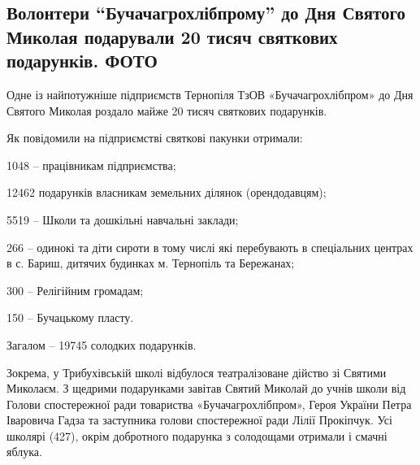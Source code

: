  
 
 
 
 
\subsection{Волонтери \enquote{Бучачагрохлібпрому} до Дня Святого Миколая подарували 20 тисяч святкових подарунків. ФОТО}
\label{sec:19_12_2021.stz.news.ua.zzte.1.podarki_sv_nikolaj_deti}


Одне із найпотужніше підприємств Тернопіля ТзОВ «Бучачагрохлібпром» до Дня
Святого Миколая роздало майже 20 тисяч святкових подарунків.


Як повідомили на підприємстві святкові пакунки отримали:

1048 – працівникам підприємства;

12462 подарунків власникам земельних ділянок (орендодавцям);

5519 – Школи та дошкільні навчальні заклади;

266 – одинокі та діти сироти в тому числі які перебувають в спеціальних центрах
в с. Бариш, дитячих будинках м. Тернопіль та Бережанах;

300 – Релігійним громадам;

150 – Бучацькому пласту.

Загалом – 19745 солодких подарунків.


Зокрема, у Трибухівській школі відбулося театралізоване дійство зі Святими
Миколаєм. З щедрими подарунками завітав Святий Миколай до учнів школи від
Голови спостережної ради товариства «Бучачагрохлібпром», Героя України Петра
Іваровича Гадза та заступника голови спостережної ради Лілії Прокіпчук. Усі
школярі (427), окрім добротного подарунка з солодощами отримали і смачні
яблука.

